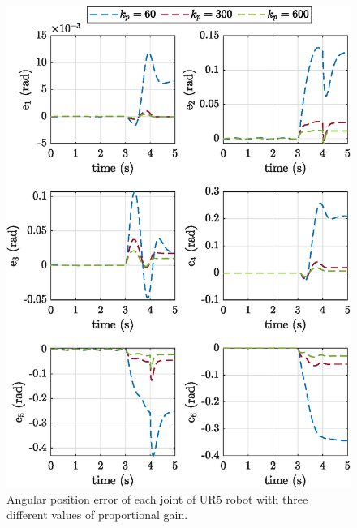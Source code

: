 	
\begin{figure}[H]
    \centering
    \includegraphics{images/act_2.4_kp_600/e_kps.eps}
    \caption{Angular position error of each joint of UR5 robot with three different values of proportional gain.}
    \label{fig:act_2.4_e_kps}
\end{figure}
